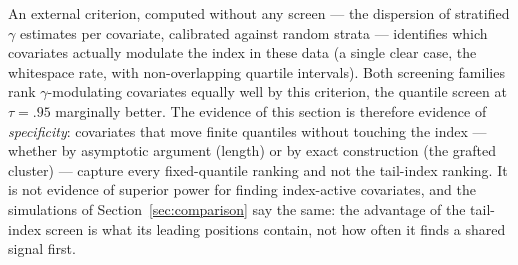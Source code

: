 An external criterion, computed without any screen --- the dispersion of
stratified $\gamma$ estimates per covariate, calibrated against random
strata --- identifies which covariates actually modulate the index in
these data (a single clear case, the whitespace rate, with
non-overlapping quartile intervals). Both screening families rank
$\gamma$-modulating covariates equally well by this criterion, the
quantile screen at $\tau=.95$ marginally better. The evidence of this
section is therefore evidence of \emph{specificity}: covariates that
move finite quantiles without touching the index --- whether by
asymptotic argument (length) or by exact construction (the grafted
cluster) --- capture every fixed-quantile ranking and not the
tail-index ranking. It is not evidence of superior power for finding
index-active covariates, and the simulations of
Section~\ref{sec:comparison} say the same: the advantage of the
tail-index screen is what its leading positions contain, not how often
it finds a shared signal first.

